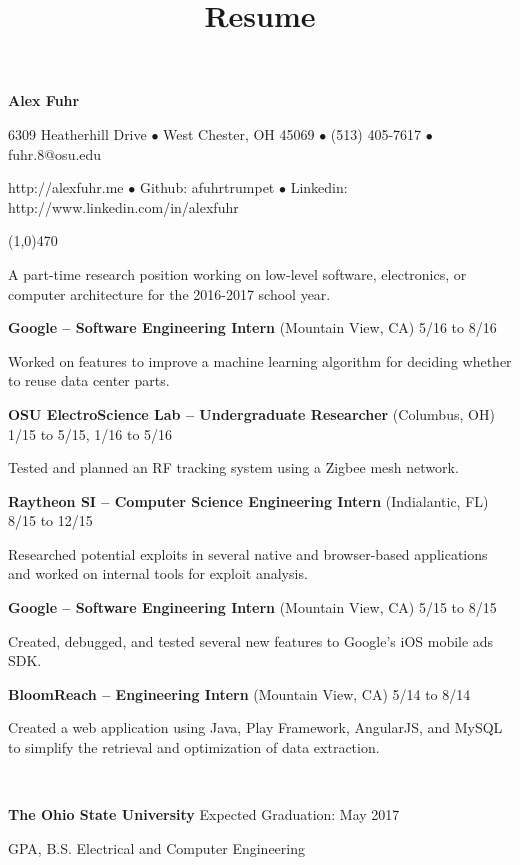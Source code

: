 \documentclass[10pt]{article}
\title{Resume}
\begin{document}
\centerline{{\LARGE \bf Alex Fuhr}}
\centerline{6309 Heatherhill Drive $\bullet$ West Chester, OH 45069 $\bullet$ (513) 405-7617 $\bullet$ fuhr.8@osu.edu}
\centerline{http://alexfuhr.me $\bullet$ Github: afuhrtrumpet $\bullet$ Linkedin: http://www.linkedin.com/in/alexfuhr}
\noindent
\line(1,0){470}\\

\smallskip

\noindent
A part-time research position working on low-level software, electronics, or computer architecture for the 2016-2017 school year.
\medskip

\smallskip

\centerline{{\large {\bf Google -- Software Engineering Intern} (Mountain View, CA) \hfill 5/16 to 8/16}}
\noindent
Worked on features to improve a machine learning algorithm for deciding whether to reuse data center parts.
\smallskip

\centerline{{\large {\bf OSU ElectroScience Lab -- Undergraduate Researcher} (Columbus, OH) \hfill 1/15 to 5/15, 1/16 to 5/16}}
\noindent
Tested and planned an RF tracking system using a Zigbee mesh network.
\smallskip

\centerline{{\large {\bf Raytheon SI -- Computer Science Engineering Intern} (Indialantic, FL) \hfill 8/15 to 12/15}}
\noindent
Researched potential exploits in several native and browser-based applications and worked on internal tools for exploit analysis.
\smallskip

\centerline{{\large {\bf Google -- Software Engineering Intern} (Mountain View, CA) \hfill 5/15 to 8/15}}
\noindent
Created, debugged, and tested several new features to Google's iOS mobile ads SDK.
\smallskip

\centerline{{\large {\bf BloomReach -- Engineering Intern} (Mountain View, CA) \hfill 5/14 to 8/14}}
\noindent
Created a web application using Java, Play Framework, AngularJS, and MySQL to simplify the retrieval and optimization of data extraction.
\smallskip

\\
\smallskip
\centerline{{\large {\bf The Ohio State University} \hfill Expected Graduation: May 2017}}
 GPA, B.S. Electrical and Computer Engineering
\medskip
\end{document}
